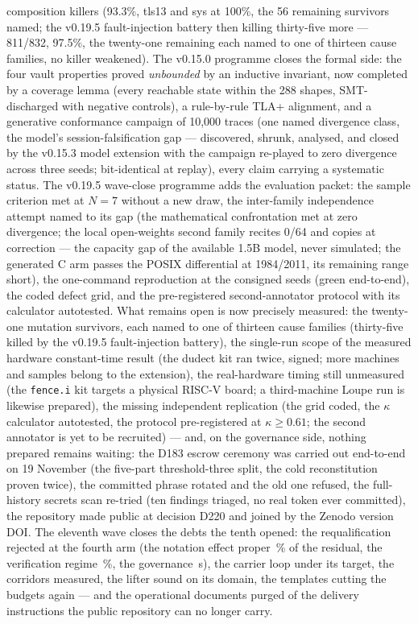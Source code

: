 \documentclass[11pt,a4paper]{article}
\newcommand{\code}[1]{\texttt{\small #1}}
\begin{document}
composition killers (93.3\%, tls13 and sys at 100\%, the 56 remaining
survivors named; the v0.19.5 fault-injection battery then killing
thirty-five more --- 811/832, 97.5\%, the twenty-one remaining each
named to one of thirteen cause families, no killer weakened). The
v0.15.0 programme closes the formal side: the four vault
properties proved \emph{unbounded} by an inductive invariant, now
completed by a coverage lemma (every reachable state within the 288
shapes, SMT-discharged with negative controls), a rule-by-rule TLA+
alignment, and a generative conformance campaign of 10{,}000 traces
(one named divergence class, the model's session-falsification gap ---
discovered, shrunk, analysed, and closed by the v0.15.3 model
extension with the campaign re-played to zero divergence across three
seeds; bit-identical at replay), every claim carrying a systematic
status. The v0.19.5 wave-close programme adds the evaluation packet:
the sample criterion met at $N{=}7$ without a new draw, the
inter-family independence attempt named to its gap (the mathematical
confrontation met at zero divergence; the local open-weights second
family recites 0/64 and copies at correction --- the capacity gap of
the available 1.5B model, never simulated; the generated C arm passes
the POSIX differential at 1984/2011, its remaining range short), the
one-command reproduction at the consigned seeds (green end-to-end),
the coded defect grid, and the pre-registered second-annotator
protocol with its calculator autotested. What remains open
is now precisely measured: the twenty-one mutation survivors, each
named to one of thirteen cause families (thirty-five killed by the
v0.19.5 fault-injection battery), the single-run scope of the measured hardware constant-time
result (the dudect kit ran twice, signed; more machines and samples
belong to the extension), the real-hardware
timing still unmeasured (the \code{fence.i} kit targets a physical RISC-V
board; a third-machine Loupe run is likewise prepared), the missing
independent replication
(the grid coded, the $\kappa$ calculator autotested, the protocol
pre-registered at $\kappa\ge0.61$; the second annotator is yet to be
recruited) --- and, on the governance side, nothing prepared remains
waiting: the D183 escrow ceremony was carried out end-to-end on 19 November
(the five-part threshold-three split, the cold reconstitution proven
twice), the committed phrase rotated and the old one refused, the
full-history secrets scan re-tried (ten findings triaged, no real
token ever committed), the repository made public at decision D220 and
joined by the Zenodo version DOI. The eleventh wave closes the debts
the tenth opened: the requalification rejected at the fourth arm (the
notation effect proper \partNotationPropre\,\% of the residual, the
verification regime \partRegime\,\%, the governance \effetGouvernanceOnze\,s),
the carrier loop under its target, the corridors measured, the lifter
sound on its domain, the templates cutting the budgets again --- and
the operational documents purged of the delivery instructions the
public repository can no longer carry.
\end{document}
